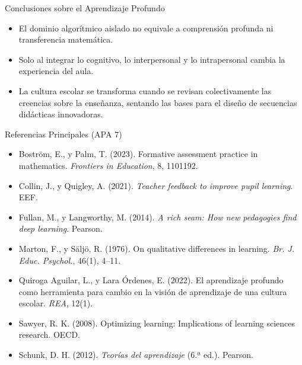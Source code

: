 \documentclass[aspectratio=169,spanish,xcolor=table]{beamer}
\begin{document}
\begin{frame}{Conclusiones sobre el Aprendizaje Profundo}
  \begin{itemize}\normalsize
    \item El dominio algorítmico aislado no equivale a comprensión profunda ni transferencia matemática.
    \item Solo al integrar lo cognitivo, lo interpersonal y lo intrapersonal cambia la experiencia del aula.
    \item La cultura escolar se transforma cuando se revisan colectivamente las creencias sobre la enseñanza, sentando las bases para el diseño de secuencias didácticas innovadoras.
  \end{itemize}
\end{frame}

\begin{frame}{Referencias Principales (APA 7)}
  \scriptsize\setlength{\parskip}{5pt}
  \begin{itemize}
    \item Boström, E., y Palm, T. (2023). Formative assessment practice in mathematics. \textit{Frontiers in Education}, 8, 1101192.
    \item Collin, J., y Quigley, A. (2021). \textit{Teacher feedback to improve pupil learning}. EEF.
    \item Fullan, M., y Langworthy, M. (2014). \textit{A rich seam: How new pedagogies find deep learning}. Pearson.
    \item Marton, F., y Säljö, R. (1976). On qualitative differences in learning. \textit{Br. J. Educ. Psychol.}, 46(1), 4--11.
    \item Quiroga Aguilar, L., y Lara Órdenes, E. (2022). El aprendizaje profundo como herramienta para cambio en la visión de aprendizaje de una cultura escolar. \textit{REA}, 12(1).
    \item Sawyer, R. K. (2008). Optimizing learning: Implications of learning sciences research. OECD.
    \item Schunk, D. H. (2012). \textit{Teorías del aprendizaje} (6.ª ed.). Pearson.
  \end{itemize}
\end{frame}
\end{document}
